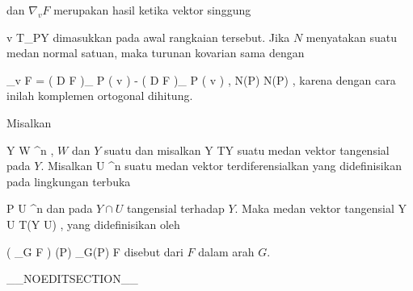 dan $\nabla_v F$ merupakan hasil ketika vektor singgung

\mavergleichskette
{\vergleichskette
{ v
}
{ \in }{ T_PY
}
{  }{
}
{    }{
}
{   }{
}
}
{}{}{}
dimasukkan pada awal rangkaian tersebut. Jika $N$ menyatakan suatu medan normal satuan, maka turunan kovarian sama dengan

\mavergleichskettedisp
{\vergleichskette
{ \nabla_v F
}
{ =} { \left(  D F   \right)_{ P } \left(  v  \right) -  \left\langle  \left(  D F   \right)_{ P } \left(  v  \right)  ,  N(P)  \right\rangle N(P)
}
{ } {
}
{ } {
}
{ } {
}
}
{}{}{,}
karena dengan cara inilah komplemen ortogonal dihitung.

{}
{

Misalkan

\mavergleichskette
{\vergleichskette
{ Y
}
{ \subseteq }{ W
}
{ \subseteq }{ \R^n
}
{    }{
}
{   }{
}
}
{}{}{,}
$W$
dan $Y$ suatu
dan misalkan
 { Y } { TY
} {}
suatu medan vektor tangensial pada $Y$. Misalkan
 { U} { \R^n
} {}
suatu medan vektor terdiferensialkan yang didefinisikan pada lingkungan terbuka

\mavergleichskette
{\vergleichskette
{ P
}
{ \in }{ U
}
{ \subseteq }{ \R^n
}
{    }{
}
{   }{
}
}
{}{}{}
dan pada $Y \cap U$ tangensial terhadap $Y$. Maka medan vektor tangensial
 { Y \cap U } { T(Y \cap U)
} {,}
yang didefinisikan oleh

\mavergleichskettedisp
{\vergleichskette
{ \left(  \nabla_G F  \right) (P)
}
{ } { \nabla_{G(P)} F }
{ } {
}
{ } {
}
{ } {
}
}
{}{}{}
disebut
dari $F$ dalam arah $G$.

}

__NOEDITSECTION__


